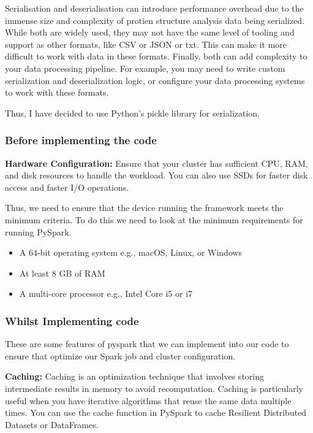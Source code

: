 \documentclass[]{final_report}
\begin{document}
Serialisation and deserialisation can introduce performance overhead due to the immense size and complexity of protien structure analysis data being serialized. While both are widely used, they may not have the same level of tooling and support as other formats, like CSV or JSON or txt. This can make it more difficult to work with data in these formats. Finally, both can add complexity to your data processing pipeline. For example, you may need to write custom serialization and deserialization logic, or configure your data processing systems to work with these formats.

Thus, I have decided to use Python's pickle library for serialization.

\clearpage

\subsubsection{Before implementing the code}
\textbf{Hardware Configuration:} Ensure that your cluster has sufficient CPU, RAM, and disk resources to handle the workload. You can also use SSDs for faster disk access and faster I/O operations.

Thus, we need to ensure that the device running the framework meets the minimum criteria. To do this we need to look at the minimum requirements for running PySpark. 

\begin{itemize}
    \item A 64-bit operating system e.g., macOS, Linux, or Windows
    \item At least 8 GB of RAM
    \item A multi-core processor e.g., Intel Core i5 or i7
\end{itemize}

\subsubsection{Whilst Implementing code}
These are some features of pyspark that we can implement into our code to ensure that optimize our Spark job and cluster configuration.

\textbf{Caching:} Caching is an optimization technique that involves storing intermediate results in memory to avoid recomputation. Caching is particularly useful when you have iterative algorithms that reuse the same data multiple times. You can use the cache function in PySpark to cache Resilient Distributed Datasets or DataFrames.
\end{document}
